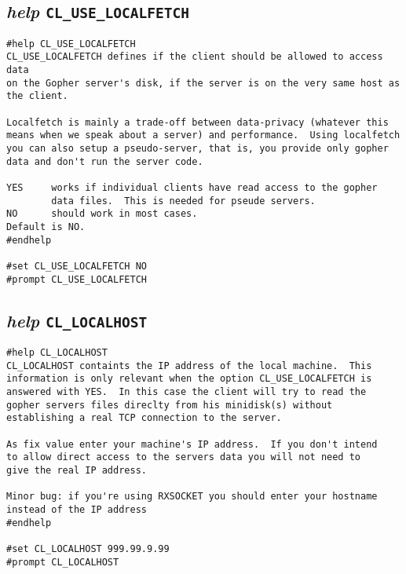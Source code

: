 \subsection{{\sl{help}} {\tt CL\_USE\_LOCALFETCH}}

\def\LPtopD{{\sl{help}} {\tt CL\_USE\_LOCALFETCH}}

\def\LPtopF{~}

\begin{verbatim}
#help CL_USE_LOCALFETCH
CL_USE_LOCALFETCH defines if the client should be allowed to access data
on the Gopher server's disk, if the server is on the very same host as
the client.

Localfetch is mainly a trade-off between data-privacy (whatever this
means when we speak about a server) and performance.  Using localfetch
you can also setup a pseudo-server, that is, you provide only gopher
data and don't run the server code.

YES     works if individual clients have read access to the gopher
        data files.  This is needed for pseude servers.
NO      should work in most cases.
Default is NO.
#endhelp

#set CL_USE_LOCALFETCH NO
#prompt CL_USE_LOCALFETCH
\end{verbatim}

\subsection{{\sl{help}} {\tt CL\_LOCALHOST}}

\def\LPtopD{{\sl{help}} {\tt CL\_LOCALHOST}}

\def\LPtopF{~}

\begin{verbatim}
#help CL_LOCALHOST
CL_LOCALHOST containts the IP address of the local machine.  This
information is only relevant when the option CL_USE_LOCALFETCH is
answered with YES.  In this case the client will try to read the
gopher servers files direclty from his minidisk(s) without
establishing a real TCP connection to the server.

As fix value enter your machine's IP address.  If you don't intend
to allow direct access to the servers data you will not need to
give the real IP address.

Minor bug: if you're using RXSOCKET you should enter your hostname
instead of the IP address
#endhelp

#set CL_LOCALHOST 999.99.9.99
#prompt CL_LOCALHOST
\end{verbatim}

